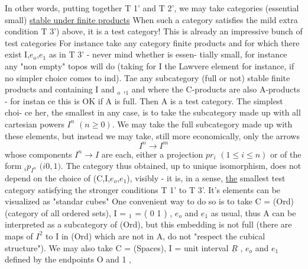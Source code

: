 In other words,  putting together  T 1' and T 2',   we
may  take categories (essential small) \uline{stable under finite products}
When such a category satisfies the mild extra condition T 3') above,  it
is a test category!  This is already an impressive bunch of test categories
For instance take any category   finite products and 
for which there exist I,$e_o$,$e_1$ as in T 3'  -  never mind whether  is essen-%
tially small,  for instance any "non empty" topos will do (taking for I
the Lawvere element for instance,  if no simpler choice comes to ind).
Tae any subcategory  (full or not) stable  finite products and containing
I and \hand{$\Delta$}$_o$ ,\hand{$\Delta$}$_1$ and where the  C-products are also A-products  -  for instan
ce this is OK if A is full.  Then A is a test category. \margin{$\lceil$} The simplest choi-%
ce her,  the smallest in any case,  is to take the subcategory made up
with all cartesian powers $I^n$ $(n\geqslant 0)$.  We may take the full subcategory
made up with these elements,  but instead we may take, still
more economically,  only the arrows
\[ I^n \rightarrow I^m \]
whose  components  $I^n \rightarrow I$ are each,  either a projection $pr_i$ $(1\leqslant i\leqslant n)$ or
of the form \hand{$\delta$}$_i$\hand{$($}$p_{I^n}$\hand{$)$} $(i$\hand{$\in\{$}$0,1$\hand{$\}$}$)$.  The category thus obtained,  up to unique
isomorphism,  does not depend on the choice of (C,I,$e_o$,$e_1$),  visibly -
it is,  in a sense,  \uline{the} smallest test category satisfying the stronger
conditions T 1' to T 3'.   It's elements can be visualized as "standar
cubes" One convenient way to do so is to take C = (Ord) (category of
all ordered sets), I = \hand{$\Delta$}$_1$ = ( \hand{$\{$}0\hand{$\}$} \hand{$\rightarrow$} \hand{$\{$}1\hand{$\}$} ) ,  $e_o$ and $e_1$ as usual,  thus
A can be interpreted as a subcategory of (Ord),  but this embedding is not
full (there are maps of $I^2$ to I in (Ord)  which are not in A,   do not
"respect the cubical structure").  We may also take  C = (Spaces),  I =
unit interval \hand{$\subset$} $\underline{R}$ ,  $e_o$ and $e_1$ defined by the endpoints  O and  1 ,
